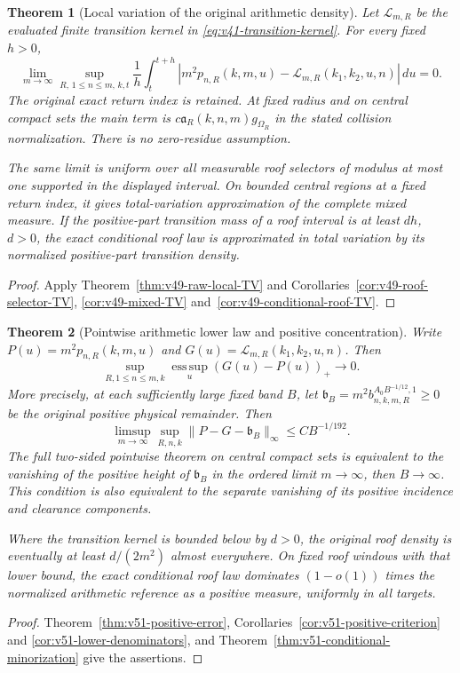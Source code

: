 \documentclass[11pt,reqno]{amsart}
\numberwithin{equation}{section}
\newtheorem{leadtheorem}{Theorem}
\theoremstyle{definition}\newtheorem{definition}[theorem]{Definition}
\theoremstyle{remark}\newtheorem{remark}[theorem]{Remark}
\begin{document}
\begin{leadtheorem}[Local variation of the original arithmetic density]
\label{thm:intro-v49-local-TV}
Let $\mathcal L_{m,R}$ be the evaluated finite transition kernel in
\eqref{eq:v41-transition-kernel}. For every fixed $h>0$,
\[
 \lim_{m\to\infty}\sup_{R,\,1\le n\le m,\,k,t}
 \frac1h\int_t^{t+h}
 |m^2p_{n,R}(k,m,u)-\mathcal L_{m,R}(k_1,k_2,u,n)|\,du=0.
\]
The original exact return index is retained. At fixed radius and on
central compact sets the main term is
$c\mathfrak a_R(k,n,m)g_{\Omega_R}$ in the stated collision
normalization. There is no zero-residue assumption.

The same limit is uniform over all measurable roof selectors of
modulus at most one supported in the displayed interval. On bounded
central regions at a fixed return index, it gives total-variation
approximation of the complete mixed measure. If the positive-part
transition mass of a roof interval is at least $dh$, $d>0$, the exact
conditional roof law is approximated in total variation by its
normalized positive-part transition density.
\end{leadtheorem}
\begin{proof}
Apply Theorem~\ref{thm:v49-raw-local-TV} and
Corollaries~\ref{cor:v49-roof-selector-TV}, \ref{cor:v49-mixed-TV}
and~\ref{cor:v49-conditional-roof-TV}.
\end{proof}


\begin{leadtheorem}[Pointwise arithmetic lower law and positive concentration]
\label{thm:intro-v51-lower}
Write $P(u)=m^2p_{n,R}(k,m,u)$ and
$G(u)=\mathcal L_{m,R}(k_1,k_2,u,n)$. Then
\[
 \sup_{R,1\le n\le m,k}\operatorname*{ess\,sup}_u(G(u)-P(u))_+
                                                       \longrightarrow0.
\]
More precisely, at each sufficiently large fixed band $B$, let
$\mathfrak b_B=m^2b^{A_0B^{-1/12},1}_{n,k,m,R}\ge0$ be the
original positive physical remainder. Then
\[
 \limsup_{m\to\infty}\sup_{R,n,k}
                  \|P-G-\mathfrak b_B\|_\infty\le CB^{-1/192}.
\]
The full two-sided pointwise theorem on central compact sets is
equivalent to the vanishing of the positive height of $\mathfrak b_B$
in the ordered limit $m\to\infty$, then $B\to\infty$.
This condition is also equivalent to the separate vanishing of its
positive incidence and clearance components.

Where the transition kernel is bounded below by $d>0$, the original
roof density is eventually at least $d/(2m^2)$ almost everywhere.
On fixed roof windows with that lower bound, the exact conditional
roof law dominates $(1-o(1))$ times the normalized arithmetic reference
as a positive measure, uniformly in all targets.
\end{leadtheorem}
\begin{proof}
Theorem~\ref{thm:v51-positive-error},
Corollaries~\ref{cor:v51-positive-criterion} and
\ref{cor:v51-lower-denominators}, and
Theorem~\ref{thm:v51-conditional-minorization} give the assertions.
\end{proof}
\end{document}
